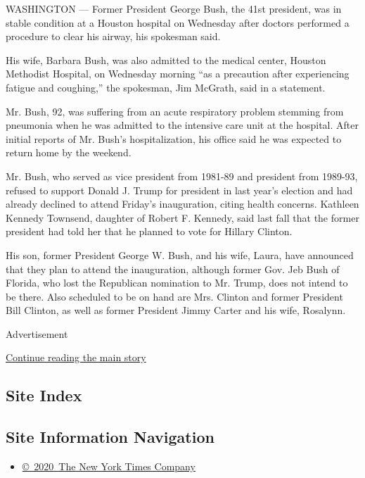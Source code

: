 WASHINGTON --- Former President George Bush, the 41st president, was in
stable condition at a Houston hospital on Wednesday after doctors
performed a procedure to clear his airway, his spokesman said.

His wife, Barbara Bush, was also admitted to the medical center, Houston
Methodist Hospital, on Wednesday morning ``as a precaution after
experiencing fatigue and coughing,'' the spokesman, Jim McGrath, said in
a statement.

Mr. Bush, 92, was suffering from an acute respiratory problem stemming
from pneumonia when he was admitted to the intensive care unit at the
hospital. After initial reports of Mr. Bush's hospitalization, his
office said he was expected to return home by the weekend.

Mr. Bush, who served as vice president from 1981-89 and president from
1989-93, refused to support Donald J. Trump for president in last year's
election and had already declined to attend Friday's inauguration,
citing health concerns. Kathleen Kennedy Townsend, daughter of Robert F.
Kennedy, said last fall that the former president had told her that he
planned to vote for Hillary Clinton.

His son, former President George W. Bush, and his wife, Laura, have
announced that they plan to attend the inauguration, although former
Gov. Jeb Bush of Florida, who lost the Republican nomination to Mr.
Trump, does not intend to be there. Also scheduled to be on hand are
Mrs. Clinton and former President Bill Clinton, as well as former
President Jimmy Carter and his wife, Rosalynn.

Advertisement

\protect\hyperlink{after-bottom}{Continue reading the main story}

\hypertarget{site-index}{%
\subsection{Site Index}\label{site-index}}

\hypertarget{site-information-navigation}{%
\subsection{Site Information
Navigation}\label{site-information-navigation}}

\begin{itemize}
\tightlist
\item
  \href{https://help.nytimes.com/hc/en-us/articles/115014792127-Copyright-notice}{©~2020~The
  New York Times Company}
\end{itemize}

